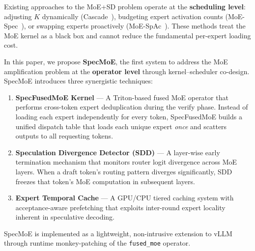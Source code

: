 \documentclass[letterpaper,twocolumn,10pt]{article}
\newcommand{\sysname}{SpecMoE\xspace}
\newcommand{\specfused}{SpecFusedMoE\xspace}
\newcommand{\sdd}{SDD\xspace}
\begin{document}
Existing approaches to the MoE+SD problem operate at the
\textbf{scheduling level}: adjusting $K$ dynamically
(Cascade~\cite{chen2024cascade}), budgeting expert activation counts
(MoE-Spec~\cite{yi2025moespec}), or swapping experts proactively
(MoE-SpAc~\cite{park2025moespac}).  These methods treat the MoE kernel as
a black box and cannot reduce the fundamental per-expert loading cost.

In this paper, we propose \textbf{\sysname}, the first system to address
the MoE amplification problem at the \textbf{operator level} through
kernel--scheduler co-design.  \sysname introduces three synergistic
techniques:

\begin{enumerate}[leftmargin=*,itemsep=2pt]
\item \textbf{\specfused Kernel} --- A Triton-based fused MoE operator
  that performs cross-token expert deduplication during the verify phase.
  Instead of loading each expert independently for every token,
  \specfused builds a unified dispatch table that loads each unique expert
  \emph{once} and scatters outputs to all requesting tokens.

\item \textbf{Speculation Divergence Detector (\sdd)} --- A layer-wise
  early termination mechanism that monitors router logit divergence across
  MoE layers.  When a draft token's routing pattern diverges
  significantly, \sdd freezes that token's MoE computation in subsequent
  layers.

\item \textbf{Expert Temporal Cache} --- A GPU/CPU tiered caching system
  with acceptance-aware prefetching that exploits inter-round expert
  locality inherent in speculative decoding.
\end{enumerate}

\sysname is implemented as a lightweight, non-intrusive extension to vLLM
through runtime monkey-patching of the \texttt{fused\_moe} operator.
\end{document}
